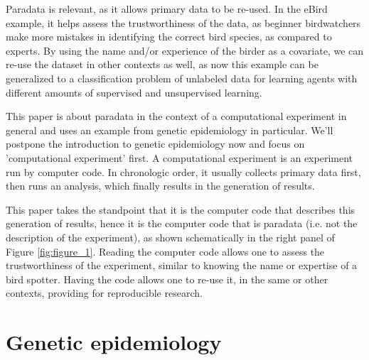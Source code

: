 
Paradata is relevant, as it allows primary data to be re-used.
In the eBird example, it helps assess the trustworthiness of the 
data, as beginner birdwatchers make more mistakes in identifying
the correct bird species, as compared to experts.
By using the name and/or experience of the birder as a covariate,
we can re-use the dataset in other contexts as well,
as now this example can be generalized to
a classification problem of unlabeled
data for learning agents with different amounts 
of supervised and unsupervised learning.


This paper is about paradata in the context of a computational
experiment in general and uses an example from genetic 
epidemiology in particular.
We'll postpone the introduction to genetic epidemiology now
and focus on 'computational experiment' first.
A computational experiment is an experiment run by computer code.
In chronologic order, it usually collects primary data first, 
then runs an analysis, which finally results in the generation of results.

This paper takes the standpoint that it is the computer code 
that describes this generation of results, 
hence it is the computer code that is paradata (i.e. not the description of the experiment),
as shown schematically in the right panel of Figure \ref{fig:figure_1}.
Reading the computer code allows one to assess the trustworthiness 
of the experiment, similar to knowing the name or expertise of a bird spotter.
Having the code allows one to re-use it, in the same or other contexts,
providing for reproducible research.

\section{Genetic epidemiology}


